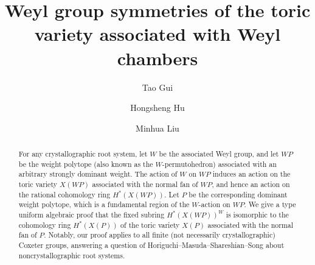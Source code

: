 \documentclass{amsart}
\author@andify\authors
\theoremstyle{definition}
\theoremstyle{remark}
\numberwithin{equation}{section}
\begin{document}
\title[Weyl group symmetries]{Weyl group symmetries of the toric variety associated with Weyl chambers}

\author{Tao Gui}
\address{(Tao Gui) \newline \indent Beijing International Center for Mathematical Research, Peking University, No.\ 5 Yiheyuan Rd, Haidian District, Beijing 100871, China}

\author{Hongsheng Hu}
\address{(Hongsheng Hu) \newline \indent School of Mathematics, Hunan University, Changsha 410082, China}

\author{Minhua Liu}
\address{(Minhua Liu) \newline \indent School of Mathematical Sciences, Shanghai Jiao Tong University, 800 Dongchuan RD, Minhang District, Shanghai 200240, China}



\begin{abstract}
For any crystallographic root system, let $W$ be the associated Weyl group, and let $\mathit{WP}$ be the weight polytope (also known as the $W$-permutohedron) associated with an arbitrary strongly dominant weight. The action of $W$ on $\mathit{WP}$ induces an action on the toric variety $X(\mathit{WP})$ associated with the normal fan of $\mathit{WP}$, and hence an action on the rational cohomology ring $H^*\left(X(\mathit{WP})\right)$. Let $P$ be the corresponding dominant weight polytope, which is a fundamental region of the $W$-action on $\mathit{WP}$. We give a type uniform algebraic proof that the fixed subring $H^*\left(X(\mathit{WP})\right)^{W}$ is isomorphic to the cohomology ring $H^*\left(X(P)\right)$ of the toric variety $X(P)$ associated with the normal fan of $P$. Notably, our proof applies to all finite (not necessarily crystallographic) Coxeter groups, answering a question of Horiguchi--Masuda--Shareshian--Song about noncrystallographic root systems.
\end{abstract}

\maketitle
\end{document}
